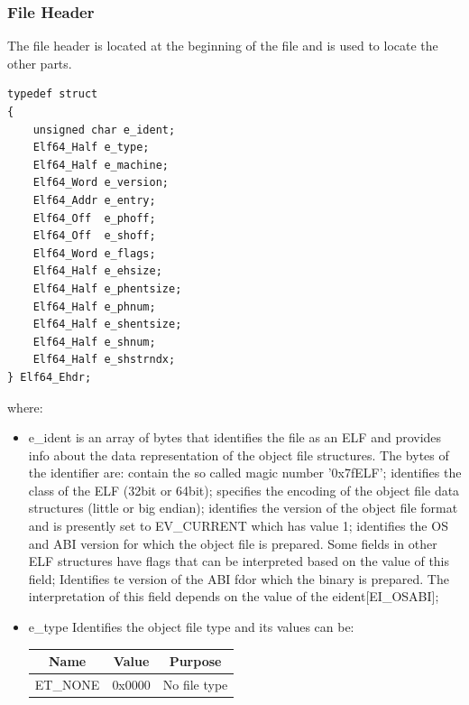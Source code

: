 \subsubsection{File Header}
The file header is located at the beginning of the file and is used to locate the other parts.
\begin{lstlisting}[style=ansic, caption={File Header}, label=ehdr] 
typedef struct
{ 
    unsigned char e_ident;
    Elf64_Half e_type;
    Elf64_Half e_machine;
    Elf64_Word e_version;
    Elf64_Addr e_entry;
    Elf64_Off  e_phoff;
    Elf64_Off  e_shoff;
    Elf64_Word e_flags;
    Elf64_Half e_ehsize;
    Elf64_Half e_phentsize;
    Elf64_Half e_phnum;
    Elf64_Half e_shentsize;
    Elf64_Half e_shnum;
    Elf64_Half e_shstrndx;
} Elf64_Ehdr; 
\end{lstlisting}
where: 
\begin{itemize} 
    \item {\ttfamily e\_ident} is an array of bytes that identifies the file as an ELF and provides info about the data representation of the object file structures. The bytes of the identifier are:
     contain the so called magic number '0x7fELF';
     identifies the class of the ELF (32bit or 64bit);
     specifies the encoding of the object file data structures (little or big endian);
     identifies the version of the object file format and is     presently set to EV\_CURRENT which has value 1;
     identifies the OS and ABI version for which the object file is prepared. Some fields in other ELF structures have flags that can be interpreted based on the value of this field;
     Identifies te version of the ABI fdor which the binary is prepared. The interpretation of this field depends on the value of the {\ttfamily e\-ident[EI\_OSABI]};
    \item {\ttfamily e\_type} Identifies the object file type and its values can be:\newline
    \begin{center}
        \begin{tabular}{|c|c|c|} \hline \textbf{Name} & \textbf{Value} & \textbf{Purpose} \\ 
            \hline {\ttfamily ET\_NONE} & 0x0000 & No file type \\

\end{tabular}
\end{center}
\end{itemize}
